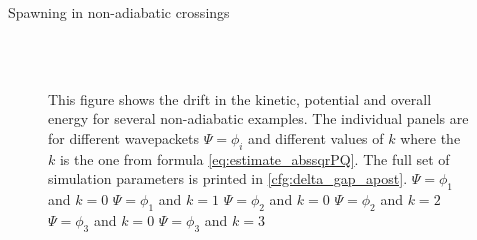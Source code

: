 \begin{chapter}{Spawning in non-adiabatic crossings}
\begin{figure}[h!]
{  } \\
   \\
  \caption[The drift in the kinetic, potential and overall energy for several non-adiabatic examples]{
  This figure shows the drift in the kinetic, potential and overall energy for
  several non-adiabatic examples. The individual panels are for different wavepackets $\Psi = \phi_i$
  and different values of $k$ where the $k$ is the one from formula \eqref{eq:estimate_abssqrPQ}.
  The full set of simulation parameters is printed in \ref{cfg:delta_gap_apost}.
   $\Psi = \phi_1$ and $k=0$
   $\Psi = \phi_1$ and $k=1$
   $\Psi = \phi_2$ and $k=0$
   $\Psi = \phi_2$ and $k=2$
   $\Psi = \phi_3$ and $k=0$
   $\Psi = \phi_3$ and $k=3$
  \label{fig:spawn_delta_gap_energy_drift1}
  }
\end{figure}



\end{chapter}
